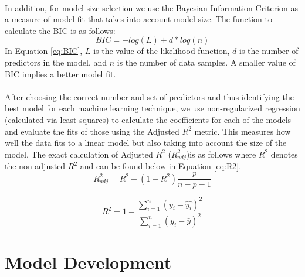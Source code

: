 \documentclass{article}
\begin{document}
\null\\
In addition, for model size selection we use the Bayesian Information Criterion as a measure of model fit that takes into account model size.  The function to calculate the BIC is as follows:
\begin{equation}
BIC=-log(L)+d*log(n)
\label{eq:BIC}
\end{equation}
In Equation \ref{eq:BIC}, $L$ is the value of the likelihood function, $d$ is the number of predictors in the model, and $n$ is the number of data samples.  A smaller value of BIC implies a better model fit.  \\
\null\\
After choosing the correct number and set of predictors and thus identifying the best model for each machine learning technique, we use non-regularized regression (calculated via least squares) to calculate the coefficients for each of the models and evaluate the fits of those using the Adjusted $R^2$ metric. This measures how well the data fits to a linear model but also taking into account the size of the model.  The exact calculation of Adjusted $R^2$ ($R^2_{adj}$)is as follows where $R^2$ denotes the non adjusted $R^2$ and can be found below in Equation \ref{eq:R2}.
\begin{equation}
R^2_{adj} = R^2-(1-R^2)\frac{p}{n-p-1}
\label{eq:AdjR2}
\end{equation}

\begin{equation}
	R^2=1-\frac{\sum_{i=1}^n (y_i-\hat{y_i})^2}{\sum_{i=1}^n (y_i-\bar{y})^2}
	\label{eq:R2}
\end{equation}
%
\section{Model Development}
\end{document}
